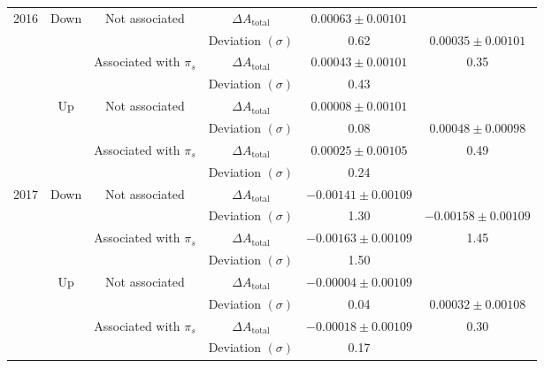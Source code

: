 \documentclass{article}
\begin{document}
\begin{center}
\begin{tabular}{c|c|c|c|c|c}
                        \multirow{8}{*}{2016} & \multirow{4}{*}{Down} & \multirow{2}{*}{Not associated} & $\Delta A_\text{total}$ & $0.00063\pm 0.00101$& \\
                        & & & Deviation $(\sigma)$ & 0.62& $0.00035\pm 0.00101$ \\
                        \cline{3-5}
                        & & \multirow{2}{*}{Associated with $\pi_s$} & $\Delta A_\text{total}$ & $0.00043\pm 0.00101$& 0.35\\
                        & & & Deviation $(\sigma)$ & 0.43& \\
                        \cline{2-6}
                        & \multirow{4}{*}{Up} & \multirow{2}{*}{Not associated} & $\Delta A_\text{total}$ & $0.00008\pm 0.00101$& \\
                        & & & Deviation $(\sigma)$ & 0.08& $0.00048\pm 0.00098$\\
                        \cline{3-5}
                        & & \multirow{2}{*}{Associated with $\pi_s$} & $\Delta A_\text{total}$ & $0.00025\pm 0.00105$& 0.49\\
                        & & & Deviation $(\sigma)$ & 0.24& \\
                        \hline

                        \multirow{8}{*}{2017} & \multirow{4}{*}{Down} & \multirow{2}{*}{Not associated} & $\Delta A_\text{total}$ & $-0.00141\pm 0.00109$& \\
                        & & & Deviation $(\sigma)$ & 1.30& $-0.00158\pm 0.00109$\\
                        \cline{3-5}
                        & & \multirow{2}{*}{Associated with $\pi_s$} & $\Delta A_\text{total}$ & $-0.00163\pm 0.00109$& 1.45\\
                        & & & Deviation $(\sigma)$ & 1.50& \\
                        \cline{2-6}
                        & \multirow{4}{*}{Up} & \multirow{2}{*}{Not associated} & $\Delta A_\text{total}$ & $-0.00004\pm 0.00109$& \\
                        & & & Deviation $(\sigma)$ & 0.04& $0.00032\pm 0.00108$\\
                        \cline{3-5}
                        & & \multirow{2}{*}{Associated with $\pi_s$} & $\Delta A_\text{total}$ & $-0.00018\pm 0.00109$& 0.30\\
                        & & & Deviation $(\sigma)$ & 0.17& \\
                        \hline


\end{tabular}
\end{center}
\end{document}
